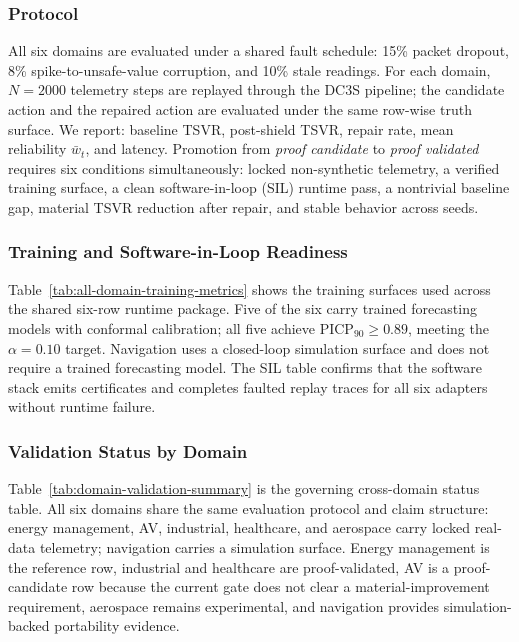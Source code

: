 \subsubsection{Protocol}

All six domains are evaluated under a shared fault schedule: 15\%
packet dropout, 8\% spike-to-unsafe-value corruption, and 10\% stale
readings.  For each domain, $N = 2000$ telemetry steps are replayed
through the DC3S pipeline; the candidate action and the repaired action
are evaluated under the same row-wise truth surface.  We report:
baseline TSVR, post-shield TSVR, repair rate, mean reliability
$\bar{w}_t$, and latency.  Promotion from \emph{proof candidate} to
\emph{proof validated} requires six conditions simultaneously: locked
non-synthetic telemetry, a verified training surface, a clean
software-in-loop (SIL) runtime pass, a nontrivial baseline gap, material
TSVR reduction after repair, and stable behavior across seeds.

\subsubsection{Training and Software-in-Loop Readiness}





Table~\ref{tab:all-domain-training-metrics} shows the training surfaces
used across the shared six-row runtime package.  Five of the six carry
trained forecasting models with conformal calibration; all five achieve
PICP$_{90} \geq 0.89$, meeting the $\alpha = 0.10$ target.  Navigation
uses a closed-loop simulation surface and does not require a trained
forecasting model.  The SIL table confirms that the software stack
emits certificates and completes faulted replay traces for all six adapters
without runtime failure.

\subsubsection{Validation Status by Domain}



Table~\ref{tab:domain-validation-summary} is the governing cross-domain
status table.  All six domains share the same evaluation protocol and
claim structure: energy management, AV, industrial, healthcare, and
aerospace carry locked real-data telemetry; navigation carries a
simulation surface.  Energy management is the reference row, industrial and
healthcare are proof-validated, AV is a proof-candidate row because the
current gate does not clear a material-improvement requirement,
aerospace remains experimental, and navigation provides
simulation-backed portability evidence.

